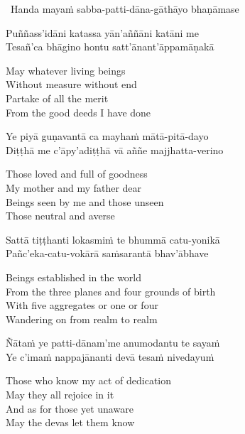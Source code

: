 \begin{leader}
  \anglebracketleft\ \hspace{-0.5mm}Handa mayaṁ sabba-patti-dāna-gāthāyo bhaṇāmase \hspace{-0.5mm}\anglebracketright\
\end{leader}

Puññass'idāni katassa yān'aññāni katāni me\\
Tesañ'ca bhāgino hontu satt'ānant'āppamāṇakā

\begin{english-verses}
  May whatever living beings\\
  Without measure without end\\
  Partake of all the merit\\
  From the good deeds I have done
\end{english-verses}

Ye piyā guṇavantā ca mayhaṁ mātā-pitā-dayo\\
Diṭṭhā me c'āpy'adiṭṭhā vā aññe majjhatta-verino

\begin{english-verses}
  Those loved and full of goodness\\
  My mother and my father dear\\
  Beings seen by me and those unseen\\
  Those neutral and averse
\end{english-verses}

Sattā tiṭṭhanti lokasmiṁ te bhummā catu-yonikā\\
Pañc'eka-catu-vokārā saṁsarantā bhav'ābhave

\begin{english-verses}
  Beings established in the world\\
  From the three planes and four grounds of birth\\
  With five aggregates or one or four\\
  Wandering on from realm to realm
\end{english-verses}

Ñātaṁ ye patti-dānam'me anumodantu te sayaṁ\\
Ye c'imaṁ nappajānanti devā tesaṁ nivedayuṁ

\ifasixversion\clearpage\fi

\begin{english-verses}
  Those who know my act of dedication\\
  May they all rejoice in it\\
  And as for those yet unaware\\
  May the devas let them know
\end{english-verses}

